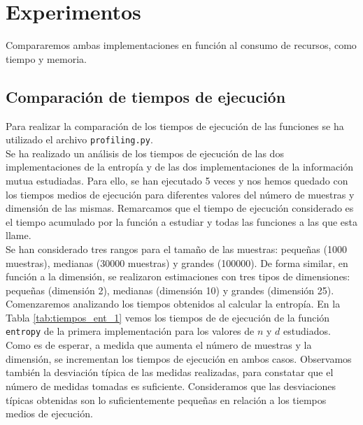\documentclass[12pt,a4paper]{report} %
\theoremstyle{definition}
\begin{document}
\section{Experimentos}

Compararemos ambas implementaciones en función al consumo de recursos, como tiempo y memoria.

\subsection{Comparación de tiempos de ejecución}

Para realizar la comparación de los tiempos de ejecución de las funciones se ha utilizado el archivo \texttt{profiling.py}.\\

Se ha realizado un análisis de los tiempos de ejecución de las dos implementaciones de la entropía y de las dos implementaciones de la información mutua estudiadas. Para ello, se han ejecutado 5 veces y nos hemos quedado con los tiempos medios de ejecución para diferentes valores del número de muestras y dimensión de las mismas. Remarcamos que el tiempo de ejecución considerado es el tiempo acumulado por la función a estudiar y todas las funciones a las que esta llame.\\

Se han considerado tres rangos para el tamaño de las muestras: pequeñas (1000 muestras), medianas (30000 muestras) y grandes (100000). De forma similar, en función a la dimensión, se realizaron estimaciones con tres tipos de dimensiones: pequeñas (dimensión 2), medianas (dimensión 10) y grandes (dimensión 25).\\

Comenzaremos analizando los tiempos obtenidos al calcular la entropía. En la Tabla \ref{tab:tiempos_ent_1} vemos los tiempos de de ejecución de la función \texttt{entropy} de la primera implementación para los valores de $n$ y $d$ estudiados. Como es de esperar, a medida que aumenta el número de muestras y la dimensión, se incrementan los tiempos de ejecución en ambos casos. Observamos también la desviación típica de las medidas realizadas, para constatar que el número de medidas tomadas es suficiente. Consideramos que las desviaciones típicas obtenidas son lo suficientemente pequeñas en relación a los tiempos medios de ejecución.\\
\end{document}
